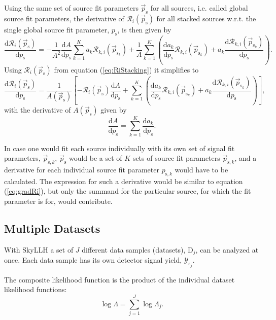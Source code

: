 \documentclass{article}
\newcommand{\ps}{\vec{p}_{\mathrm{s}}}
\newcommand{\psk}{\vec{p}_{\mathrm{s}_k}}
\begin{document}
Using the same set of source fit parameters $\ps$ for all sources, i.e. called
global source fit parameters, the derivative of $\mathcal{R}_i(\ps)$ for
all stacked sources w.r.t. the single global source fit parameter,
$p_{\mathrm{s}}$, is then given by
\begin{equation}
 \frac{\mathrm{d} \mathcal{R}_{i}(\ps)}{\mathrm{d} p_{\mathrm{s}}} = - \frac{1}{A^2} \frac{\mathrm{d} A}{\mathrm{d} p_{\mathrm{s}}} \sum_{k=1}^{K} a_{k} \mathcal{R}_{k,i}(\psk) + \frac{1}{A}\sum_{k=1}^{K} \left( \frac{\mathrm{d} a_{k}}{\mathrm{d} p_{\mathrm{s}}}\mathcal{R}_{k,i}(\psk) + a_{k}\frac{\mathrm{d} \mathcal{R}_{k,i}(\psk)}{\mathrm{d} p_{\mathrm{s}}} \right).
\end{equation}
Using $\mathcal{R}_i(\ps)$ from equation (\ref{eq:RiStacking}) it simplifies to
\begin{equation}
 \frac{\mathrm{d} \mathcal{R}_{i}(\ps)}{\mathrm{d} p_{\mathrm{s}}} = \frac{1}{A(\ps)}\left[ -\mathcal{R}_i(\ps)\frac{\mathrm{d} A}{\mathrm{d} p_{\mathrm{s}}} + \sum_{k=1}^{K} \left( \frac{\mathrm{d} a_{k}}{\mathrm{d} p_{\mathrm{s}}}\mathcal{R}_{k,i}(\psk) + a_{k}\frac{\mathrm{d} \mathcal{R}_{k,i}(\psk)}{\mathrm{d} p_{\mathrm{s}}} \right) \right],
 \label{eq:gradRi}
\end{equation}
with the derivative of $A(\ps)$ given by
\begin{equation}
 \frac{\mathrm{d} A}{\mathrm{d} p_{\mathrm{s}}} = \sum_{k=1}^{K} \frac{\mathrm{d} a_k}{\mathrm{d} p_{\mathrm{s}}}.
\end{equation}

In case one would fit each source individually with its own set of signal fit
parameters, $\vec{p}_{\mathrm{s},k}$, $\ps$ would be a set of $K$ sets
of source fit parameters $\vec{p}_{\mathrm{s},k}$, and a derivative for each
individual source fit parameter $p_{\mathrm{s},k}$ would have to be calculated.
The expression for such a derivative would be similar to equation (\ref{eq:gradRi}),
but only the summand for the particular source, for which the fit parameter is for, would
contribute.


\subsection{Multiple Datasets}

With SkyLLH a set of $J$ different data samples (datasets), $\mathrm{D}_j$, can be
analyzed at once. Each data sample has its own detector signal yield,
$\mathcal{Y}_{\mathrm{s}_j}$.

The composite likelihood function is the product of the individual dataset
likelihood functions:
\begin{equation}
 \log \Lambda = \sum_{j=1}^{J} \log \Lambda_j.
 \label{eq:logLambdaComposite}
\end{equation}
\end{document}
